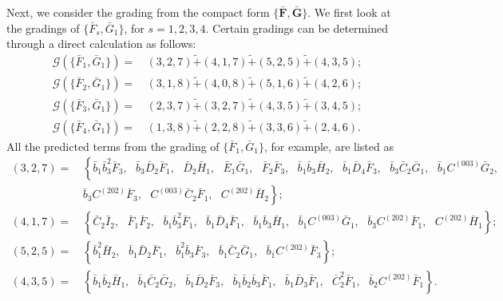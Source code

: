 \documentclass[10pt]{amsart}
\theoremstyle{definition}
\theoremstyle{corollary}
\theoremstyle{remark}
\theoremstyle{conclusion}
\begin{document}
Next, we consider the grading from the compact form $\{\bar{\textbf{F}},\bar{\textbf{G}}\}$. We first look at the gradings of $\{\bar{F}_s, \bar{G}_1\}$, for $s=1,2,3,4$. Certain gradings can be determined through a direct calculation as follows: \begin{align}
    \mathcal{G} \left(\{\bar{F}_1, \bar{G}_1\}\right)  = & \, (3,2,7) \tilde{+} (4,1,7)\tilde{+} (5,2,5)\tilde{+} (4,3,5); \nonumber\\
    \mathcal{G} \left(\{\bar{F}_2, \bar{G}_1\}\right)  = & \, (3,1,8) \tilde{+} (4,0,8)\tilde{+} (5,1,6)\tilde{+} (4,2,6); \nonumber \\
    \mathcal{G} \left(\{\bar{F}_3, \bar{G}_1\}\right)  = & \,(2,3,7) \tilde{+} (3,2,7)\tilde{+} (4,3,5)\tilde{+} (3,4,5); \nonumber \\
    \mathcal{G} \left(\{\bar{F}_4, \bar{G}_1\}\right)  = & \, (1,3,8) \tilde{+} (2,2,8)\tilde{+} (3,3,6)\tilde{+} (2,4,6). 
    \end{align}  
 All the predicted terms from the grading of $\{\bar{F}_1, \bar{G}_1\}$,  for example, are listed as 
 \begin{align*}
    (3,2,7) = &\, \left\{\bar{b}_1 \bar{b}_3^2 \bar{F}_3, \text{ } \bar{b}_3 \bar{D}_2 \bar{F}_1 , \text{ } \bar{D}_2 \bar{H}_1, \text{ } \bar{E}_1 \bar{G}_1, \text{ } \bar{F}_2 \bar{F}_3, \text{ } \bar{b}_1 \bar{b}_3 \bar{H}_2, \text{ } \bar{b}_1 \bar{D}_4 \bar{F}_3, \text{ } \bar{b}_3 \bar{C}_2 \bar{G}_1, \text{ } \bar{b}_1 C^{(003)} \bar{G}_2,  \right. \\
    & \, \left. \bar{b}_3 C^{(202)} \bar{F}_3, \text{ } C^{(003)} \bar{C}_2 \bar{F}_1, \text{ } C^{(202)} \bar{H}_2\right\} ; \\
    (4,1,7)= &\, \left\{ \bar{C}_2 \bar{I}_2, \text{ } \bar{F}_1 \bar{F}_2, \text{ } \bar{b}_1 \bar{b}_3^2 \bar{F}_1, \text{ } \bar{b}_1 \bar{D}_4 \bar{F}_1, \text{ } \bar{b}_1 \bar{b}_3 \bar{H}_1, \text{ } \bar{b}_1 C^{(003)} \bar{G}_1, \text{ } \bar{b}_3 C^{(202)} \bar{F}_1, \text{ } C^{(202)} \bar{H}_1\right\} ; \\
    (5,2,5)= &\, \left\{ \bar{b}_1^2 \bar{H}_2, \text{ } \bar{b}_1 \bar{D}_2 \bar{F}_1, \text{ } \bar{b}_1^2 \bar{b}_3 \bar{F}_3, \text{ } \bar{b}_1 \bar{C}_2 \bar{G}_1, \text{ } \bar{b}_1 C^{(202)} \bar{F}_3\right\} ; \\
    (4,3,5)= &\, \left\{\bar{b}_1 \bar{b}_2 \bar{H}_1, \text{ } \bar{b}_1 \bar{C}_2 \bar{G}_2, \text{ } \bar{b}_1 \bar{D}_2 \bar{F}_3, \text{ } \bar{b}_1 \bar{b}_2 \bar{b}_3 \bar{F}_1, \text{ } \bar{b}_1 \bar{D}_3 \bar{F}_1, \text{ } \bar{C}_2^2 \bar{F}_1, \text{ } \bar{b}_2 C^{(202)} \bar{F}_1 \right\}.
\end{align*} 
\end{document}
